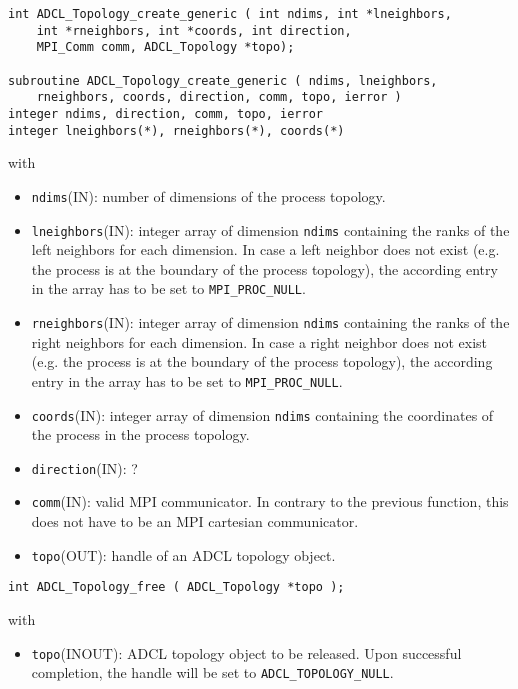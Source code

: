 \hspace{1cm}
\begin{verbatim}
int ADCL_Topology_create_generic ( int ndims, int *lneighbors, 
    int *rneighbors, int *coords, int direction,  
    MPI_Comm comm, ADCL_Topology *topo);
				   
subroutine ADCL_Topology_create_generic ( ndims, lneighbors,
    rneighbors, coords, direction, comm, topo, ierror )
integer ndims, direction, comm, topo, ierror
integer lneighbors(*), rneighbors(*), coords(*)				   
\end{verbatim}
with
\begin{itemize}
\item {\tt ndims}(IN): number of dimensions of the process topology.
\item {\tt lneighbors}(IN): integer array of dimension {\tt ndims} containing the ranks
	of the left neighbors for each dimension. In case a left neighbor does not exist (e.g. the 
	process is at the boundary of the process topology), the according entry in the array 
	has to be set to {\tt MPI\_PROC\_NULL}.
\item {\tt rneighbors}(IN): integer array of dimension {\tt ndims} containing the ranks
	of the right neighbors for each dimension. In case a right neighbor does not exist (e.g. the 
	process is at the boundary of the process topology), the according entry in the array 
	has to be set to {\tt MPI\_PROC\_NULL}.
\item {\tt coords}(IN): integer array of dimension {\tt ndims} containing the coordinates 
  of the process in the process topology.
\item {\tt direction}(IN): ?
\item {\tt comm}(IN): valid MPI communicator. In contrary to the previous function, this does not
 have to be an MPI cartesian communicator.
\item {\tt topo}(OUT): handle of an ADCL topology object.
\end{itemize}


\hspace{1cm}
\begin{verbatim}
int ADCL_Topology_free ( ADCL_Topology *topo );
\end{verbatim}
with
\begin{itemize}
\item {\tt topo}(INOUT): ADCL topology object to be released. Upon successful completion, the handle will be set to {\tt ADCL\_TOPOLOGY\_NULL}.
\end{itemize}

